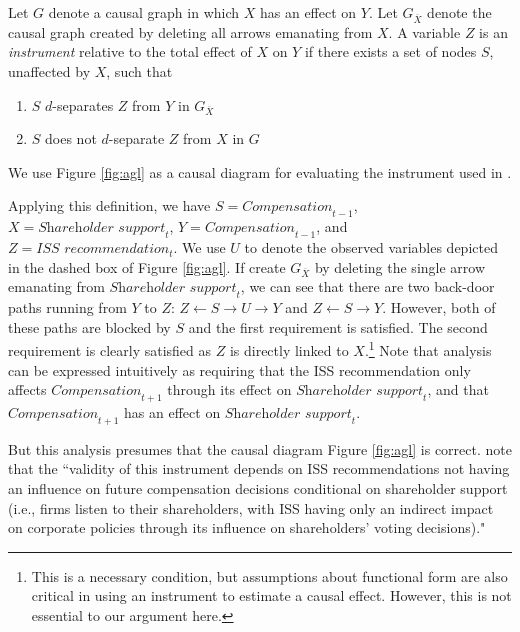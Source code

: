 \documentclass[11pt,reqno,titlepage]{amsart}
\begin{document}
\begin{definition}[Instrument]
Let $G$ denote a causal graph in which $X$ has an effect on $Y$. 
Let $G_{\overline{X}}$ denote the causal graph created by deleting all arrows emanating from $X$.
A variable $Z$ is an \emph{instrument} relative to the total effect of $X$ on $Y$ if there exists a set of nodes $S$, unaffected by $X$, such that
\begin{enumerate}
\item $S$ $d$-separates $Z$ from $Y$ in $G_{\overline{X}}$
\item $S$ does not $d$-separate $Z$ from $X$ in $G$
\end{enumerate}
\end{definition}

We use Figure \ref{fig:agl} as a causal diagram for evaluating the instrument used in \citet{Armstrong:2013io}.

Applying this definition, we have $S = \textit{Compensation}_{t-1}$,
$X =\textit{Shareholder support}_{t}$, $Y = \textit{Compensation}_{t-1}$, and $Z = \textit{ISS recommendation}_{t}$.
We use $U$ to denote the observed variables depicted in the dashed box of Figure \ref{fig:agl}.
If create $G_{\overline{X}}$ by deleting the single arrow emanating from $\textit{Shareholder support}_{t}$, we can see that there are two back-door paths running from $Y$ to $Z$: 
$Z \leftarrow S \rightarrow U \rightarrow Y$ and $Z \leftarrow S \rightarrow Y$.
However, both of these paths are blocked by $S$ and the first requirement is satisfied.
The second requirement is clearly satisfied as $Z$ is directly linked to $X$.\footnote{
This is a necessary condition, but assumptions about functional form are also critical in using an instrument to estimate a causal effect.
However, this is not essential to our argument here.}
%
Note that analysis can be expressed intuitively as requiring that the ISS recommendation only affects $\textit{Compensation}_{t+1}$ through its effect on $\textit{Shareholder support}_{t}$, and that $\textit{Compensation}_{t+1}$ has an effect on $\textit{Shareholder support}_{t}$.

But this analysis presumes that the causal diagram Figure \ref{fig:agl} is correct.
\citet[p.\,912]{Armstrong:2013io} note that the ``validity of this instrument depends on ISS recommendations not having an influence on future compensation decisions conditional on shareholder support (i.e., firms listen to their shareholders, with ISS having only an indirect impact on corporate policies through its influence on shareholders' voting decisions)."
\end{document}
